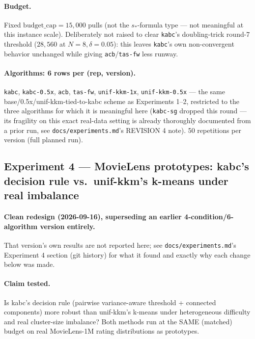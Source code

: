 \documentclass[11pt]{article}
\begin{document}
\paragraph{Budget.} Fixed $\text{budget\_cap}=15{,}000$ pulls (not the
$s_*$-formula type --- not meaningful at this instance scale). Deliberately
not raised to clear \texttt{kabc}'s doubling-trick round-7 threshold
($28{,}560$ at $N=8,\delta=0.05$): this leaves \texttt{kabc}'s own
non-convergent behavior unchanged while giving \texttt{acb}/\texttt{tas-fw}
less runway.

\paragraph{Algorithms: 6 rows per (rep, version).} \texttt{kabc},
\texttt{kabc-0.5x}, \texttt{acb}, \texttt{tas-fw}, \texttt{unif-kkm-1x},
\texttt{unif-kkm-0.5x} --- the same base/0.5x/unif-kkm-tied-to-kabc scheme
as Experiments 1--2, restricted to the three algorithms for which it is
meaningful here (\texttt{kabc-sg} dropped this round --- its fragility on
this exact real-data setting is already thoroughly documented from a prior
run, see \texttt{docs/experiments.md}'s REVISION 4 note). 50 repetitions per
version (full planned run).

\subsection{Experiment 4 --- MovieLens prototypes: kabc's decision rule vs.\ unif-kkm's k-means under real imbalance}
\label{sec:setup-exp4}

\paragraph{Clean redesign (2026-09-16), superseding an earlier
4-condition/6-algorithm version entirely.} That version's own results are
not reported here; see \texttt{docs/experiments.md}'s Experiment 4 section
(git history) for what it found and exactly why each change below was made.

\paragraph{Claim tested.} Is kabc's decision rule (pairwise variance-aware
threshold + connected components) more robust than unif-kkm's k-means under
heterogeneous difficulty and real cluster-size imbalance? Both methods run
at the SAME (matched) budget on real MovieLens-1M rating distributions as
prototypes.
\end{document}
